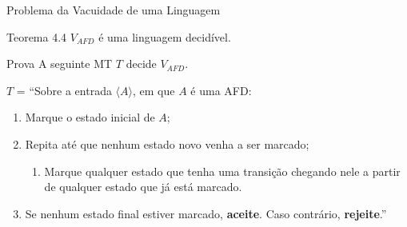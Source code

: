 \documentclass[xcolor=dvipsnames,table]{beamer}
\begin{document}
	\begin{frame}{Problema da Vacuidade de uma Linguagem}
		\begin{block}{Teorema 4.4}
			$V_{AFD}$ é uma linguagem decidível.
		\end{block} \pause
		\begin{block}{Prova}
			A seguinte MT $T$ decide $V_{AFD}$.
			
			$T$ = ``Sobre a entrada $\langle A \rangle$, em que $A$ é uma AFD:
			\begin{enumerate}
				\item Marque o estado inicial de $A$;
				\item Repita até que nenhum estado novo venha a ser marcado;
					\begin{enumerate}
						\item Marque qualquer estado que tenha uma transição chegando nele a partir de qualquer estado que já está marcado.
					\end{enumerate}
				\item Se nenhum estado final estiver marcado, {\bf aceite}. Caso contrário, {\bf rejeite}.''
			\end{enumerate}
		\end{block}
	\end{frame}
	
	\begin{frame}
		\titlepage
	\end{frame}
	
\end{document}
